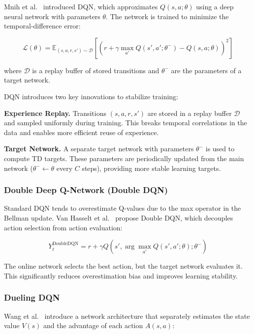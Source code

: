 Mnih et al.~\cite{mnih2013playing, mnih2015human} introduced DQN, which approximates $Q(s,a; \theta)$ using a deep neural network with parameters $\theta$. The network is trained to minimize the temporal-difference error:

\begin{equation}
\mathcal{L}(\theta) = \mathbb{E}_{(s,a,r,s') \sim \mathcal{D}}\left[\left(r + \gamma \max_{a'} Q(s',a';\theta^-) - Q(s,a;\theta)\right)^2\right]
\end{equation}

where $\mathcal{D}$ is a replay buffer of stored transitions and $\theta^-$ are the parameters of a target network.

DQN introduces two key innovations to stabilize training:

\textbf{Experience Replay.} Transitions $(s,a,r,s')$ are stored in a replay buffer $\mathcal{D}$ and sampled uniformly during training. This breaks temporal correlations in the data and enables more efficient reuse of experience.

\textbf{Target Network.} A separate target network with parameters $\theta^-$ is used to compute TD targets. These parameters are periodically updated from the main network ($\theta^- \leftarrow \theta$ every $C$ steps), providing more stable learning targets.

\subsubsection{Double Deep Q-Network (Double DQN)}

Standard DQN tends to overestimate Q-values due to the max operator in the Bellman update. Van Hasselt et al.~\cite{van2016deep} propose Double DQN, which decouples action selection from action evaluation:

\begin{equation}
Y_t^{\text{DoubleDQN}} = r + \gamma Q(s', \arg\max_{a'} Q(s',a';\theta); \theta^-)
\end{equation}

The online network selects the best action, but the target network evaluates it. This significantly reduces overestimation bias and improves learning stability.

\subsubsection{Dueling DQN}

Wang et al.~\cite{wang2016dueling} introduce a network architecture that separately estimates the state value $V(s)$ and the advantage of each action $A(s,a)$:

